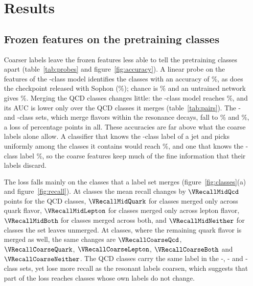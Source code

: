 \section{Results}\label{sec:results}

\subsection{Frozen features on the pretraining classes}\label{sec:frozen}

Coarser labels leave the frozen features less able to tell the pretraining classes apart (table~\ref{tab:probes} and
figure~\ref{fig:accuracy}).
A linear probe on the features of the \Kfull-class model identifies the \Kfull{} classes with an accuracy of
\VLpJcTwoFull\%, as does the checkpoint released with Sophon (\VLpJcTwoSophon\%); chance is \VChance\% and an untrained
network gives \VLpJcTwoUntrained\%.
Merging the QCD classes changes little: the \Kres-class model reaches \VLpJcTwoRes\%, and its AUC is lower only over the
QCD classes it merges (table~\ref{tab:pairs}).
The \Kmid- and \Kcoarse-class sets, which merge flavors within the resonance decays, fall to \VLpJcTwoMid\% and
\VLpJcTwoCoarse\%, a loss of \VDLpJcTwoCoarse{} percentage points in all.
These accuracies are far above what the coarse labels alone allow.
A classifier that knows the \Kcoarse-class label of a jet and picks uniformly among the classes it contains would reach
\VLabelOnlyCoarse\%, and one that knows the \Kmid-class label \VLabelOnlyMid\%, so the coarse features keep much of the
fine information that their labels discard.


The loss falls mainly on the classes that a label set merges (figure~\ref{fig:classes}(a) and
figure~\ref{fig:recall}).
At \Kmid{} classes the mean recall changes by $\VRecallMidQcd$ points for the QCD classes, $\VRecallMidQuark$ for
classes merged only across quark flavor, $\VRecallMidLepton$ for classes merged only across lepton flavor,
$\VRecallMidBoth$ for classes merged across both, and $\VRecallMidNeither$ for classes the set leaves unmerged.
At \Kcoarse{} classes, where the remaining quark flavor is merged as well, the same changes are $\VRecallCoarseQcd$,
$\VRecallCoarseQuark$, $\VRecallCoarseLepton$, $\VRecallCoarseBoth$ and $\VRecallCoarseNeither$.
The QCD classes carry the same label in the \Kres-, \Kmid- and \Kcoarse-class sets, yet lose more recall as the resonant
labels coarsen, which suggests that part of the loss reaches classes whose own labels do not change.

